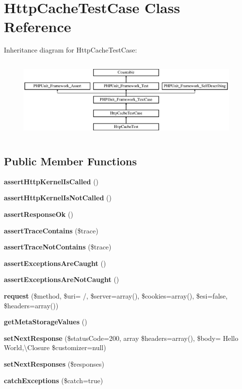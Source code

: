 \section{Http\+Cache\+Test\+Case Class Reference}
\label{class_symfony_1_1_component_1_1_http_kernel_1_1_tests_1_1_http_cache_1_1_http_cache_test_case}
Inheritance diagram for Http\+Cache\+Test\+Case\+:\begin{figure}[H]
\begin{center}
\leavevmode
\includegraphics[height=4.129793cm]{class_symfony_1_1_component_1_1_http_kernel_1_1_tests_1_1_http_cache_1_1_http_cache_test_case}
\end{center}
\end{figure}
\subsection*{Public Member Functions}
\begin{DoxyCompactItemize}
\item 
{\bf assert\+Http\+Kernel\+Is\+Called} ()
\item 
{\bf assert\+Http\+Kernel\+Is\+Not\+Called} ()
\item 
{\bf assert\+Response\+Ok} ()
\item 
{\bf assert\+Trace\+Contains} (\$trace)
\item 
{\bf assert\+Trace\+Not\+Contains} (\$trace)
\item 
{\bf assert\+Exceptions\+Are\+Caught} ()
\item 
{\bf assert\+Exceptions\+Are\+Not\+Caught} ()
\item 
{\bf request} (\$method, \$uri= \textquotesingle{}/\textquotesingle{}, \$server=array(), \$cookies=array(), \$esi=false, \$headers=array())
\item 
{\bf get\+Meta\+Storage\+Values} ()
\item 
{\bf set\+Next\+Response} (\$status\+Code=200, array \$headers=array(), \$body= \textquotesingle{}Hello World\textquotesingle{},\textbackslash{}Closure \$customizer=null)
\item 
{\bf set\+Next\+Responses} (\$responses)
\item 
{\bf catch\+Exceptions} (\$catch=true)
\end{DoxyCompactItemize}
